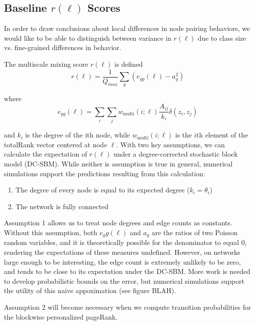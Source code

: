 \documentclass[12pt]{article}
\begin{document}
\subsection{Baseline $r(\ell)$ Scores}

In order to draw conclusions about local differences in node pairing behaviors, we would like to be able to distinguish between variance in $r(\ell)$ due to class size vs. fine-grained differences in behavior.  

The multiscale mixing score $r(\ell)$ is defined
\begin{equation}
  r(\ell) = \frac{1}{Q_{max}} \sum_g (e_{gg}(\ell) - a_g^2)
\end{equation}

where 
\begin{equation}
  e_{gg}(\ell) = \sum_i \sum_j w_{\text{multi}}(i; \ell) \frac{A_{ij}}{k_i} \delta(z_i, z_j) 
\end{equation}

and $k_i$ is the degree of the ith node, while $w_{\text{multi}}(i; \ell)$ is the $i$th element of the totalRank vector centered at node $\ell$.  With two key assumptions, we can calculate the expectation of $r(\ell)$ under a degree-corrected stochastic block model (DC-SBM).  While neither is assumption is true in general, numerical simulations support the predictions resulting from this calculation:

\begin{enumerate}
  \item The degree of every node is equal to its expected degree ($k_i = \theta_i$)
  \item The network is fully connected
\end{enumerate}

Assumption 1 allows us to treat node degrees and edge counts as constants.  Without this assumption, both $e_gg(\ell)$ and $a_g$ are the ratios of two Poisson random variables, and it is theoretically possible for the denominator to equal 0, rendering the expectations of these measures undefined.  However, on networks large enough to be interesting, the edge count is extremely unlikely to be zero, and tends to be close to its expectation under the DC-SBM.  More work is needed to develop probabilistic bounds on the error, but numerical simulations support the utility of this naive appoximation (see figure BLAH).    

Assumption 2 will become necessary when we compute transition probabilities for the blockwise personalized pageRank. 
\end{document}

